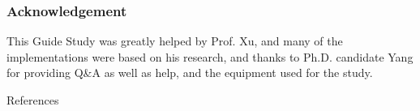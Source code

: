 \documentclass{beamer}
\begin{document}
\appendix
\begin{frame}
  \frametitle{Acknowledgement}
  This Guide Study was greatly helped by Prof. Xu, and many of the implementations were based on his research, and thanks to Ph.D. candidate Yang for providing Q\&A as well as help, and the equipment used for the study.
\end{frame}

\begin{frame}[allowframebreaks]{References} 
\fontsize{7pt}{7pt}\selectfont
\end{frame}
\end{document}
